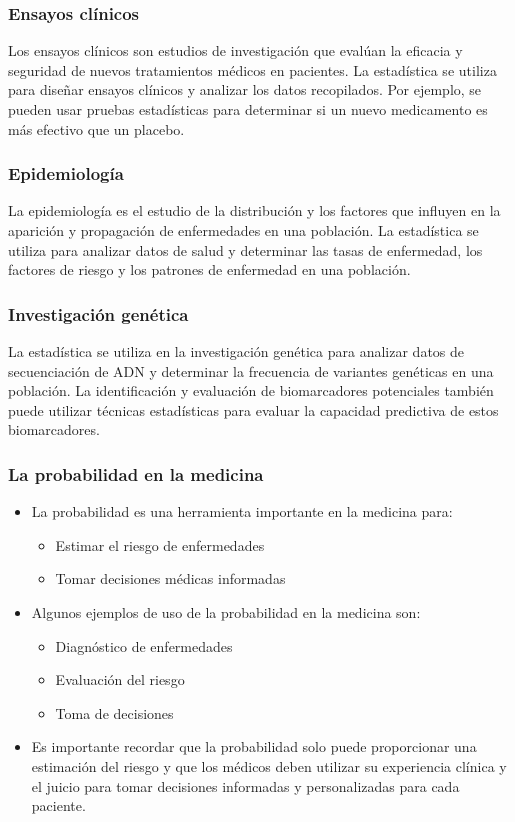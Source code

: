 \documentclass{beamer}
\begin{document}
\begin{frame}
\frametitle{Ensayos clínicos}
\justify
Los ensayos clínicos son estudios de investigación que evalúan la eficacia y seguridad de nuevos tratamientos médicos en pacientes. La estadística se utiliza para diseñar ensayos clínicos y analizar los datos recopilados. Por ejemplo, se pueden usar pruebas estadísticas para determinar si un nuevo medicamento es más efectivo que un placebo.
\end{frame}

\begin{frame}
\frametitle{Epidemiología}
\justify
La epidemiología es el estudio de la distribución y los factores que influyen en la aparición y propagación de enfermedades en una población. La estadística se utiliza para analizar datos de salud y determinar las tasas de enfermedad, los factores de riesgo y los patrones de enfermedad en una población.
\end{frame}

\begin{frame}
\frametitle{Investigación genética}
\justify
La estadística se utiliza en la investigación genética para analizar datos de secuenciación de ADN y determinar la frecuencia de variantes genéticas en una población. La identificación y evaluación de biomarcadores potenciales también puede utilizar técnicas estadísticas para evaluar la capacidad predictiva de estos biomarcadores.
\end{frame}

\begin{frame}
\frametitle{La probabilidad en la medicina}

\begin{itemize}
\item La probabilidad es una herramienta importante en la medicina para:
\vspace{0.1cm}
\begin{itemize}
\item Estimar el riesgo de enfermedades
\item Tomar decisiones médicas informadas
\end{itemize}
\vspace{0.1cm}
\item Algunos ejemplos de uso de la probabilidad en la medicina son:
\vspace{0.1cm}
\begin{itemize}
\item Diagnóstico de enfermedades
\item Evaluación del riesgo
\item Toma de decisiones
\end{itemize}
\justify
\item Es importante recordar que la probabilidad solo puede proporcionar una estimación del riesgo y que los médicos deben utilizar su experiencia clínica y el juicio para tomar decisiones informadas y personalizadas para cada paciente.
\end{itemize}
\end{frame}
\end{document}

